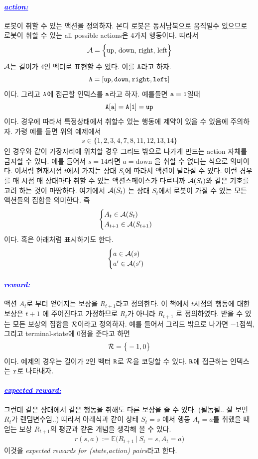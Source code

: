 \documentclass[12pt,oneside,english,a4paper]{article}
\newcommand{\parablue}[1]{\paragraph{\Large\textcolor{blue}{\it\underline{\textbf{#1:}}}}\Large}
\begin{document}
\parablue{action} 로봇이 취할 수 있는 액션을 정의하자. 본디 로봇은 동서남북으로 움직일수 있으므로 로봇이 취할 수 있는 all possible actions은 4가지 행동이다. 따라서 
\begin{align*}
{\cal A}=\Big\{\mbox{up, down, right, left} \Big\}
\end{align*}
${\cal A}$는 길이가 4인 벡터로 표현할 수 있다. 이를 $\tt A$라고 하자. 
\[
\tt A=[up,down,right,left]
\]
이다. 그리고 $\tt A$에 접근할 인덱스를 $\tt a$라고 하자. 예를들면 $\tt a=1$일때 
\[
{\tt A[a]=A[1]=up}
\]
이다. 경우에 따라서 특정상태에서 취할수 있는 행동에 제약이 있을 수 있음에 주의하자. 가령 예를 들면 위의 예제에서 
\begin{align*}
s \in \Big\{1,2,3,4,7,8,11,12,13,14\Big\}
\end{align*}
인 경우와 같이 가장자리에 위치할 경우 그리드 밖으로 나가게 만드는 action 자체를 금지할 수 있다. 예를 들어서 $s=14$라면 $a=\mbox{down}$ 을 취할 수 없다는 식으로 의미이다. 이처럼 현재시점 $t$에서 가지는 상태 $S_t$에 따라서 액션이 달라질 수 있다. 이런 경우를 매 시점 매 상태마다 취할 수 있는 액션스페이스가 다르니까 ${\cal A}(S_t)$와 같은 기호를 고려 하는 것이 마땅하다. 여기에서 ${\cal A}(S_t)$ 는 상태 $S_t$에서 로봇이 가질 수 있는 모든 액션들의 집합을 의미한다. 즉 
\begin{align*}
\begin{cases}
A_t \in {\cal A}(S_t)\\
A_{t+1} \in {\cal A}(S_{t+1})
\end{cases}
\end{align*}
이다. 혹은 아래처럼 표시하기도 한다. 
\begin{align*}
\begin{cases}
a \in {\cal A}(s) \\ 
a' \in {\cal A}(s')
\end{cases}
\end{align*}

\parablue{reward} 액션 $A_t$로 부터 얻어지는 보상을 $R_{t+1}$라고 정의한다. 이 책에서 $t$시점의 행동에 대한 보상은 $t+1$ 에 주어진다고 가정하므로 $R_t$가 아니라 $R_{t+1}$ 로 정의하였다. 받을 수 있는 모든 보상의 집합을 ${\cal R}$이라고 정의하자. 예를 들어서 그리드 밖으로 나가면 $-1$점씩, 그리고 terminal-state에 0점을 준다고 하면 
\begin{align*}
{\cal R}=\big\{-1,0\big\}
\end{align*}
이다. 예제의 경우는 길이가 2인 벡터 $\tt R$로 ${\cal R}$을 코딩할 수 있다. $\tt R$에 접근하는 인덱스는 $\tt r$로 나타내자. 

\parablue{expected reward} 그런데 같은 상태에서 같은 행동을 취해도 다른 보상을 줄 수 있다. (될놈될.. 잘 보면 $R_t$가 랜덤변수임..) 따라서 아래식과 같이 상태 $S_t=s$ 에서 행동 $A_t=a$를 취했을 때 얻는 보상 $R_{t+1}$의 평균과 같은 개념을 생각해 볼 수 있다. 
\begin{align*}
r(s,a):= \mathbb{E} \big( R_{t+1} ~ |~ S_t=s, A_t=a \big)
\end{align*}
이것을 \emph{{expected rewards for (state,action) pairs}}라고 한다.
\end{document}
